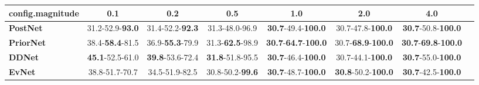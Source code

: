 \begin{tabular}{lccccccc}
\toprule
\textbf{config.magnitude} &                      0.1 &                      0.2 &                      0.5 &                                         1.0 &                                2.0 &                                         4.0 \\
\midrule
\textbf{PostNet } &  31.2-52.9-\textbf{93.0} &  31.4-52.2-\textbf{92.3} &           31.3-48.0-96.9 &           \textbf{30.7}-49.4-\textbf{100.0} &           30.7-47.8-\textbf{100.0} &           \textbf{30.7}-50.8-\textbf{100.0} \\
\textbf{PriorNet} &  38.4-\textbf{58.4}-81.5 &  36.9-\textbf{55.3}-79.9 &  31.3-\textbf{62.5}-98.9 &  \textbf{30.7}-\textbf{64.7}-\textbf{100.0} &  30.7-\textbf{68.9}-\textbf{100.0} &  \textbf{30.7}-\textbf{69.8}-\textbf{100.0} \\
\textbf{DDNet   } &  \textbf{45.1}-52.5-61.0 &  \textbf{39.8}-53.6-72.4 &  \textbf{31.8}-51.8-95.5 &           \textbf{30.7}-46.4-\textbf{100.0} &           30.7-44.1-\textbf{100.0} &           \textbf{30.7}-55.0-\textbf{100.0} \\
\textbf{EvNet   } &           38.8-51.7-70.7 &           34.5-51.9-82.5 &  30.8-50.2-\textbf{99.6} &           \textbf{30.7}-48.7-\textbf{100.0} &  \textbf{30.8}-50.2-\textbf{100.0} &           \textbf{30.7}-42.5-\textbf{100.0} \\
\bottomrule
\end{tabular}
